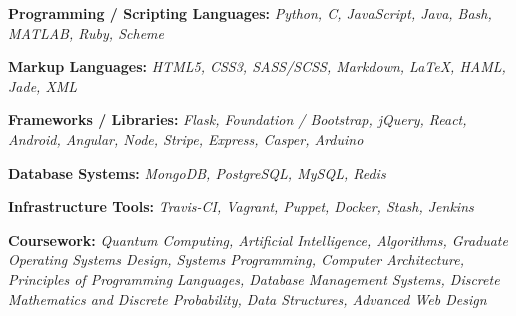 \documentclass[12pt,a4paper,sans]{moderncv} %
\begin{document}
\begin{itemize}

\item{\textbf{Programming / Scripting Languages:} \textit{Python, C, JavaScript, Java, Bash,  MATLAB, Ruby, Scheme}

\small{}}

\vspace{6pt}

\item{\textbf{Markup Languages:}\textit{ HTML5, CSS3, SASS/SCSS, Markdown, LaTeX, HAML, Jade, XML }

\vspace{3pt}

\small{}}

\vspace{6pt}

\item{\textbf{Frameworks / Libraries:}\textit{ Flask, Foundation / Bootstrap, jQuery, React, Android, Angular, Node, Stripe, Express, Casper, Arduino}

\vspace{3pt}

\item{\textbf{Database Systems:}\textit{ MongoDB, PostgreSQL, MySQL, Redis} }

\vspace{3pt}

\small{}}

\vspace{6pt}

\item{\textbf{Infrastructure Tools:}\textit{ Travis-CI, Vagrant, Puppet, Docker, Stash, Jenkins }

\vspace{3pt}

\small{}}

\vspace{6pt}

\item{\textbf{Coursework:}\textit{ Quantum Computing, Artificial Intelligence, Algorithms, Graduate Operating Systems Design, Systems Programming, Computer Architecture, Principles of Programming Languages, Database Management Systems, Discrete Mathematics and Discrete Probability, Data Structures, Advanced Web Design} }

\vspace{3pt}

\small{}

\vspace{6pt}

\end{itemize}
\end{document}
